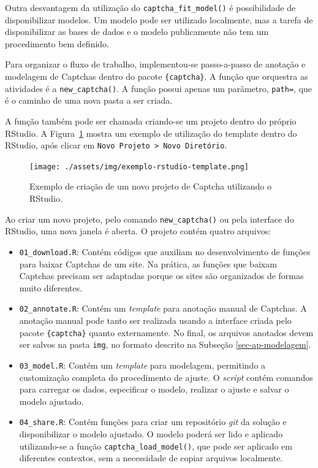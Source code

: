 \documentclass[12pt,twoside,brazilian]{book}
\providecommand{\tightlist}{%
  \setlength{\itemsep}{0pt}\setlength{\parskip}{0pt}}
\begin{document}
Outra desvantagem da utilização do \texttt{captcha\_fit\_model()} é
possibilidade de disponibilizar modelos. Um modelo pode ser utilizado
localmente, mas a tarefa de disponibilizar as bases de dados e o modelo
publicamente não tem um procedimento bem definido.

Para organizar o fluxo de trabalho, implementou-se passo-a-passo de
anotação e modelagem de Captchas dentro do pacote \texttt{\{captcha\}}.
A função que orquestra as atividades é a \texttt{new\_captcha()}. A
função possui apenas um parâmetro, \texttt{path=}, que é o caminho de
uma nova pasta a ser criada.

A função também pode ser chamada criando-se um projeto dentro do próprio
RStudio. A Figura~\ref{fig-exemplo-rstudio-template} mostra um exemplo
de utilização do template dentro do RStudio, após clicar em
\texttt{Novo\ Projeto\ \textgreater{}\ Novo\ Diretório}.

\begin{figure}

{\centering \texttt{[image: ./assets/img/exemplo-rstudio-template.png]}

}

\caption{\label{fig-exemplo-rstudio-template}Exemplo de criação de um
novo projeto de Captcha utilizando o RStudio.}

\end{figure}

Ao criar um novo projeto, pelo comando \texttt{new\_captcha()} ou pela
interface do RStudio, uma nova janela é aberta. O projeto contém quatro
arquivos:

\begin{itemize}
\tightlist
\item
  \texttt{01\_download.R}: Contém códigos que auxiliam no
  desenvolvimento de funções para baixar Captchas de um site. Na
  prática, as funções que baixam Captchas precisam ser adaptadas porque
  os sites são organizados de formas muito diferentes.
\item
  \texttt{02\_annotate.R}: Contém um \emph{template} para anotação
  manual de Captchas. A anotação manual pode tanto ser realizada usando
  a interface criada pelo pacote \texttt{\{captcha\}} quanto
  externamente. No final, os arquivos anotados devem ser salvos na pasta
  \texttt{img}, no formato descrito na Subseção \ref{sec-ap-modelagem}.
\item
  \texttt{03\_model.R}: Contém um \emph{template} para modelagem,
  permitindo a customização completa do procedimento de ajuste. O
  \emph{script} contém comandos para carregar os dados, especificar o
  modelo, realizar o ajuste e salvar o modelo ajustado.
\item
  \texttt{04\_share.R}: Contém funções para criar um repositório
  \emph{git} da solução e disponibilizar o modelo ajustado. O modelo
  poderá ser lido e aplicado utilizando-se a função
  \texttt{captcha\_load\_model()}, que pode ser aplicado em diferentes
  contextos, sem a necessidade de copiar arquivos localmente.
\end{itemize}
\end{document}

